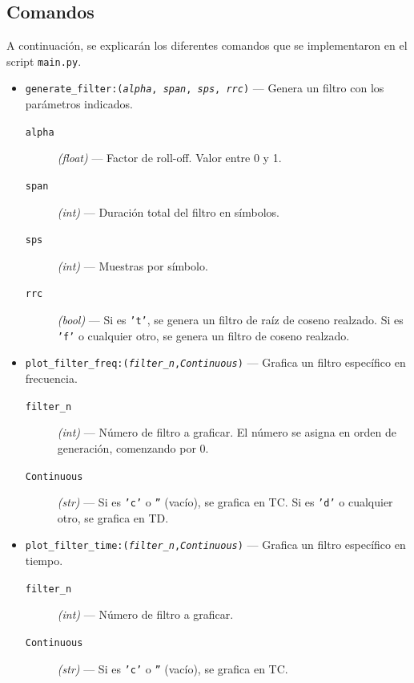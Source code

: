 \subsection{Comandos}
A continuación, se explicarán los diferentes comandos que se implementaron en el script \texttt{main.py}.
\begin{itemize}
    \item \texttt{generate\_filter:(\textit{alpha}, \textit{span}, \textit{sps}, \textit{rrc})} ---
    Genera un filtro con los parámetros indicados.
        \begin{description}
            \item[\texttt{alpha}] \textit{(float)} --- 
                Factor de roll-off. Valor entre 0 y 1.
            \item[\texttt{span}] \textit{(int)} --- 
                Duración total del filtro en símbolos.
            \item[\texttt{sps}] \textit{(int)} ---
                Muestras por símbolo.
            \item[\texttt{rrc}] \textit{(bool)} ---
                Si es \texttt{'t'}, se genera un filtro de raíz de coseno realzado.
                Si es \texttt{'f'} o cualquier otro, se genera un filtro de coseno realzado.
        \end{description}
    \item \texttt{plot\_filter\_freq:(\textit{filter\_n},\textit{Continuous})} ---
    Grafica un filtro específico en frecuencia.
        \begin{description}
            \item[\texttt{filter\_n}] \textit{(int)} --- 
                Número de filtro a graficar. El número se asigna en orden de generación, comenzando por 0.
            \item[\texttt{Continuous}] \textit{(str)} ---
                Si es \texttt{'c'} o \texttt{''} (vacío), se grafica en TC.
                Si es \texttt{'d'} o cualquier otro, se grafica en TD.
        \end{description}
    \item \texttt{plot\_filter\_time:(\textit{filter\_n},\textit{Continuous})} ---
    Grafica un filtro específico en tiempo.
        \begin{description}
            \item[\texttt{filter\_n}] \textit{(int)} --- 
                Número de filtro a graficar.
            \item[\texttt{Continuous}] \textit{(str)} ---
                Si es \texttt{'c'} o \texttt{''} (vacío), se grafica en TC.

\end{description}
\end{itemize}
